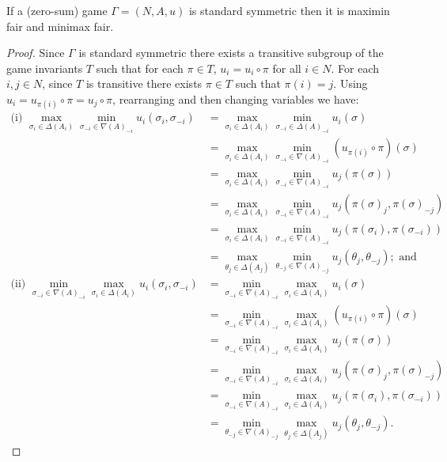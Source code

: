 \begin{proposition} \label{prop:standsymgamesaremaxminandminmaxfair}
	If a (zero-sum) game $\Gamma = (N, A, u)$ is standard symmetric then it is maximin fair and minimax fair.
	
	\begin{proof}
		Since $\Gamma$ is standard symmetric there exists a transitive subgroup of the game invariants $T$ such that for each $\pi \in T$, $u_i = u_i \circ \pi$ for all $i \in N$. For each $i, j \in N$, since $T$ is transitive there exists $\pi \in T$ such that $\pi(i) = j$. Using $u_i = u_{\pi(i)} \circ \pi = u_j \circ \pi$, rearranging and then changing variables we have:
		\begin{align*}
			\text{(i) }\max_{\sigma_i \in \Delta(A_i)}\min_{\sigma_{-i} \in {\nabla(A)}_{-i}} u_i(\sigma_i, \sigma_{-i}) &= \max_{\sigma_i \in \Delta(A_i)}\min_{\sigma_{-i} \in \Delta(A)_{-i}} u_i(\sigma) \\
			&= \max_{\sigma_i \in \Delta(A_i)}\min_{\sigma_{-i} \in {\nabla(A)}_{-i}} (u_{\pi(i)} \circ \pi)(\sigma) \\
			&= \max_{\sigma_i \in \Delta(A_i)}\min_{\sigma_{-i} \in {\nabla(A)}_{-i}} u_j\left(\pi(\sigma)\right) \\
			&= \max_{\sigma_i \in \Delta(A_i)}\min_{\sigma_{-i} \in {\nabla(A)}_{-i}} u_j\left(\pi(\sigma)_j, \pi(\sigma)_{-j}\right) \\
			&= \max_{\sigma_i \in \Delta(A_i)}\min_{\sigma_{-i} \in {\nabla(A)}_{-i}} u_j\left(\pi(\sigma_i), \pi(\sigma_{-i})\right) \\
			&= \max_{\theta_j \in \Delta(A_j)}\min_{\theta_{-j} \in {\nabla(A)}_{-j}} u_j(\theta_j, \theta_{-j}); \text{ and} \\
			\text{(ii) }\min_{\sigma_{-i} \in {\nabla(A)}_{-i}}\max_{\sigma_i \in \Delta(A_i)} u_i(\sigma_i, \sigma_{-i}) &= \min_{\sigma_{-i} \in {\nabla(A)}_{-i}}\max_{\sigma_i \in \Delta(A_i)} u_i(\sigma) \\
			&= \min_{\sigma_{-i} \in {\nabla(A)}_{-i}}\max_{\sigma_i \in \Delta(A_i)} (u_{\pi(i)} \circ \pi)(\sigma) \\
			&= \min_{\sigma_{-i} \in {\nabla(A)}_{-i}}\max_{\sigma_i \in \Delta(A_i)} u_j\left(\pi(\sigma)\right) \\
			&= \min_{\sigma_{-i} \in {\nabla(A)}_{-i}}\max_{\sigma_i \in \Delta(A_i)} u_j\left(\pi(\sigma)_j, \pi(\sigma)_{-j}\right) \\
			&= \min_{\sigma_{-i} \in {\nabla(A)}_{-i}}\max_{\sigma_i \in \Delta(A_i)} u_j\left(\pi(\sigma_i), \pi(\sigma_{-i})\right) \\
			&= \min_{\theta_{-j} \in {\nabla(A)}_{-j}}\max_{\theta_j \in \Delta(A_j)} u_j(\theta_j, \theta_{-j}). 
		\end{align*} 
	\end{proof}
\end{proposition}

